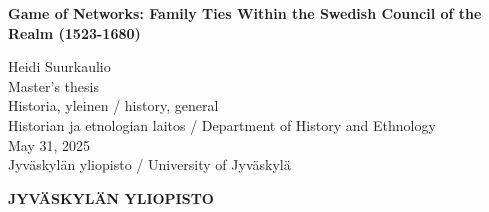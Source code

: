 %
\begin{titlepage}
    \mbox{}\vfill
    \begin{center}
        {\bf\Large Game of Networks: Family Ties Within the Swedish Council of the Realm (1523-1680)}\\
        \vfill
        \begin{flushright}
            Heidi Suurkaulio\\[4pt]
            Master's thesis\\[4pt]%
            Historia, yleinen / history, general\\[4pt]
            Historian ja etnologian laitos / Department of History and Ethnology\\[4pt]
            May 31, 2025\\[4pt]
            Jyväskylän yliopisto / University of Jyväskylä
        \end{flushright}
    \end{center}
\end{titlepage}

\thispagestyle{empty}

{\bf\Large JYVÄSKYLÄN YLIOPISTO}

